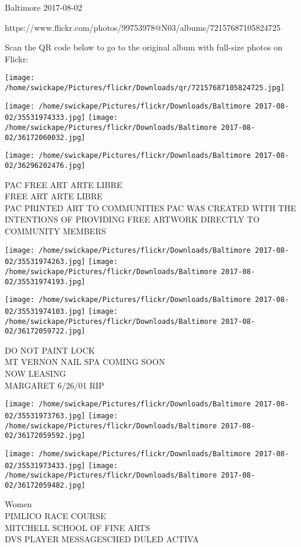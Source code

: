 \documentclass[10pt,letterpaper]{article}
\begin{document}
Baltimore 2017-08-02

https://www.flickr.com/photos/99753978@N03/albums/72157687105824725

Scan the QR code below to go to the original album with full-size photos on Flickr:

\texttt{[image: /home/swickape/Pictures/flickr/Downloads/qr/72157687105824725.jpg]}
\pagebreak

\texttt{[image: /home/swickape/Pictures/flickr/Downloads/Baltimore 2017-08-02/35531974333.jpg]}
\texttt{[image: /home/swickape/Pictures/flickr/Downloads/Baltimore 2017-08-02/36172060032.jpg]}

\vspace{0.25in}
\texttt{[image: /home/swickape/Pictures/flickr/Downloads/Baltimore 2017-08-02/36296202476.jpg]}

PAC FREE ART ARTE LIBRE\\
FREE ART ARTE LIBRE\\
PAC PRINTED ART TO COMMUNITIES PAC WAS CREATED WITH THE INTENTIONS OF PROVIDING FREE ARTWORK DIRECTLY TO COMMUNITY MEMBERS
\pagebreak

\texttt{[image: /home/swickape/Pictures/flickr/Downloads/Baltimore 2017-08-02/35531974263.jpg]}
\texttt{[image: /home/swickape/Pictures/flickr/Downloads/Baltimore 2017-08-02/35531974193.jpg]}

\texttt{[image: /home/swickape/Pictures/flickr/Downloads/Baltimore 2017-08-02/35531974103.jpg]}
\texttt{[image: /home/swickape/Pictures/flickr/Downloads/Baltimore 2017-08-02/36172059722.jpg]}

DO NOT PAINT LOCK\\
MT VERNON NAIL SPA COMING SOON\\
NOW LEASING\\
MARGARET 6/26/01 RIP
\pagebreak

\texttt{[image: /home/swickape/Pictures/flickr/Downloads/Baltimore 2017-08-02/35531973763.jpg]}
\texttt{[image: /home/swickape/Pictures/flickr/Downloads/Baltimore 2017-08-02/36172059592.jpg]}

\texttt{[image: /home/swickape/Pictures/flickr/Downloads/Baltimore 2017-08-02/35531973433.jpg]}
\texttt{[image: /home/swickape/Pictures/flickr/Downloads/Baltimore 2017-08-02/36172059482.jpg]}

Women\\
PIMLICO RACE COURSE\\
MITCHELL SCHOOL OF FINE ARTS\\
DVS PLAYER MESSAGESCHED DULED ACTIVA
\pagebreak
\end{document}
